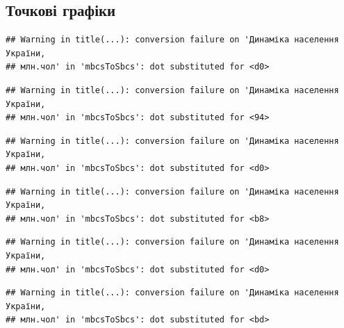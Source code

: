 \documentclass[
]{article}
\newenvironment{Shaded}{\begin{snugshade}}{\end{snugshade}}
\newcommand{\CommentTok}[1]{\textcolor[rgb]{0.56,0.35,0.01}{\textit{#1}}}
\newcommand{\DataTypeTok}[1]{\textcolor[rgb]{0.13,0.29,0.53}{#1}}
\newcommand{\DecValTok}[1]{\textcolor[rgb]{0.00,0.00,0.81}{#1}}
\newcommand{\KeywordTok}[1]{\textcolor[rgb]{0.13,0.29,0.53}{\textbf{#1}}}
\newcommand{\NormalTok}[1]{#1}
\newcommand{\OperatorTok}[1]{\textcolor[rgb]{0.81,0.36,0.00}{\textbf{#1}}}
\newcommand{\StringTok}[1]{\textcolor[rgb]{0.31,0.60,0.02}{#1}}
\begin{document}
\hypertarget{ux442ux43eux447ux43aux43eux432ux456-ux433ux440ux430ux444ux456ux43aux438}{%
\subsection{Точкові
графіки}\label{ux442ux43eux447ux43aux43eux432ux456-ux433ux440ux430ux444ux456ux43aux438}}

\begin{Shaded}
\end{Shaded}

\begin{verbatim}
## Warning in title(...): conversion failure on 'Динаміка населення України,
## млн.чол' in 'mbcsToSbcs': dot substituted for <d0>
\end{verbatim}

\begin{verbatim}
## Warning in title(...): conversion failure on 'Динаміка населення України,
## млн.чол' in 'mbcsToSbcs': dot substituted for <94>
\end{verbatim}

\begin{verbatim}
## Warning in title(...): conversion failure on 'Динаміка населення України,
## млн.чол' in 'mbcsToSbcs': dot substituted for <d0>
\end{verbatim}

\begin{verbatim}
## Warning in title(...): conversion failure on 'Динаміка населення України,
## млн.чол' in 'mbcsToSbcs': dot substituted for <b8>
\end{verbatim}

\begin{verbatim}
## Warning in title(...): conversion failure on 'Динаміка населення України,
## млн.чол' in 'mbcsToSbcs': dot substituted for <d0>
\end{verbatim}

\begin{verbatim}
## Warning in title(...): conversion failure on 'Динаміка населення України,
## млн.чол' in 'mbcsToSbcs': dot substituted for <bd>
\end{verbatim}
\end{document}
